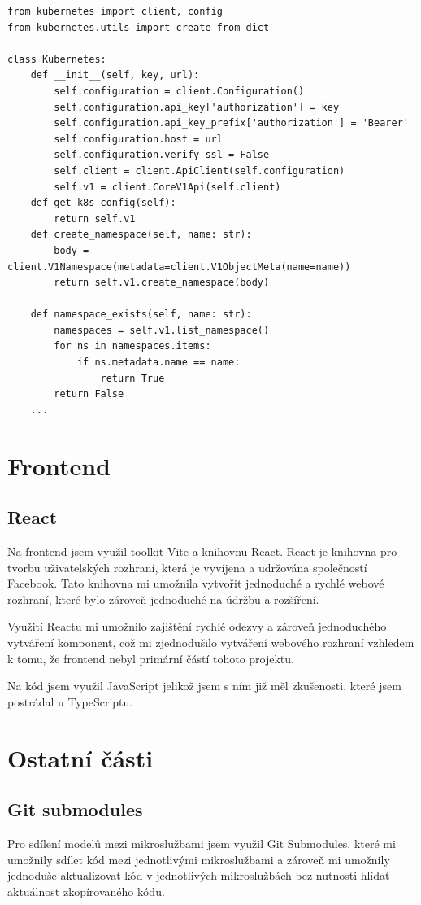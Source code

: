 \documentclass[12pt, a4paper,
oneside,      %
openright
]{report}
\begin{document}
\begin{lstlisting}[style=Python, caption=Ukázka třídy pro připojení ke Kubernetes]
from kubernetes import client, config
from kubernetes.utils import create_from_dict

class Kubernetes:
    def __init__(self, key, url):
        self.configuration = client.Configuration()
        self.configuration.api_key['authorization'] = key
        self.configuration.api_key_prefix['authorization'] = 'Bearer'
        self.configuration.host = url
        self.configuration.verify_ssl = False
        self.client = client.ApiClient(self.configuration)
        self.v1 = client.CoreV1Api(self.client)
    def get_k8s_config(self):
        return self.v1
    def create_namespace(self, name: str):
        body = client.V1Namespace(metadata=client.V1ObjectMeta(name=name))
        return self.v1.create_namespace(body)

    def namespace_exists(self, name: str):
        namespaces = self.v1.list_namespace()
        for ns in namespaces.items:
            if ns.metadata.name == name:
                return True
        return False
	...
\end{lstlisting}

\section{Frontend}
\subsection{React}
Na frontend jsem využil toolkit Vite a knihovnu React. React je knihovna pro tvorbu uživatelských rozhraní, která je vyvíjena a udržována společností Facebook. Tato knihovna mi umožnila vytvořit jednoduché a rychlé webové rozhraní, které bylo zároveň jednoduché na údržbu a rozšíření.

Využití Reactu mi umožnilo zajištění rychlé odezvy a zároveň jednoduchého vytváření komponent, což mi zjednodušilo vytváření webového rozhraní vzhledem k tomu, že frontend nebyl primární částí tohoto projektu.

Na kód jsem využil JavaScript jelikož jsem s ním již měl zkušenosti, které jsem postrádal u TypeScriptu.

\section{Ostatní části}
\subsection{Git submodules}
Pro sdílení modelů mezi mikroslužbami jsem využil Git Submodules, které mi umožnily sdílet kód mezi jednotlivými mikroslužbami a zároveň mi umožnily jednoduše aktualizovat kód v jednotlivých mikroslužbách bez nutnosti hlídat aktuálnost zkopírovaného kódu.
\end{document}
